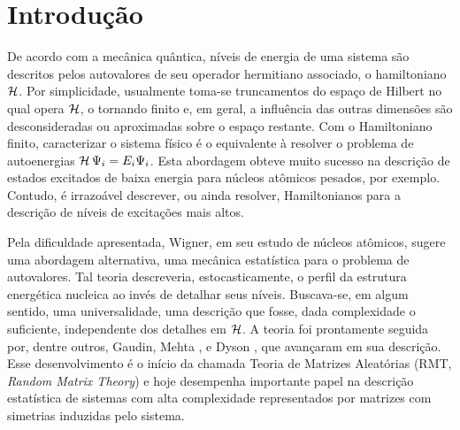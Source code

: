 \chapter{Introdução}
\label{Capitulo: Intro}

De acordo com a mecânica quântica, níveis de energia de uma sistema são descritos pelos autovalores de seu operador hermitiano associado, o hamiltoniano $\operatorname{\mathcal{H}}$. Por simplicidade, usualmente toma-se truncamentos do espaço de Hilbert no qual opera $\operatorname{\mathcal{H}}$, o tornando finito e, em geral, a influência das outras dimensões são desconsideradas ou aproximadas sobre o espaço restante. Com o Hamiltoniano finito, caracterizar o sistema físico é o equivalente à resolver o problema de autoenergias $\operatorname{\mathcal{H}} \Psi_i = E_i \Psi_i$. Esta abordagem obteve muito sucesso na descrição de estados excitados de baixa energia para núcleos atômicos pesados, por exemplo. Contudo, é irrazoável descrever, ou ainda resolver, Hamiltonianos para a descrição de níveis de excitações mais altos.


Pela dificuldade apresentada, Wigner, em seu estudo de núcleos atômicos, sugere uma abordagem alternativa, uma mecânica estatística para o problema de autovalores. Tal teoria descreveria, estocasticamente, o perfil da estrutura energética nucleica ao invés de detalhar seus níveis. Buscava-se, em algum sentido, uma universalidade, uma descrição que fosse, dada complexidade o suficiente, independente dos detalhes em $\operatorname{\mathcal{H}}$. A teoria foi prontamente seguida por, dentre outros, Gaudin, Mehta \cite{MehtaGaudin}, e Dyson \cite{Dyson}, que avançaram em sua descrição. Esse desenvolvimento é o início da chamada Teoria de Matrizes Aleatórias (RMT, \textit{Random Matrix Theory}) e hoje desempenha importante papel na descrição estatística de sistemas com alta complexidade representados por matrizes com simetrias induzidas pelo sistema.

